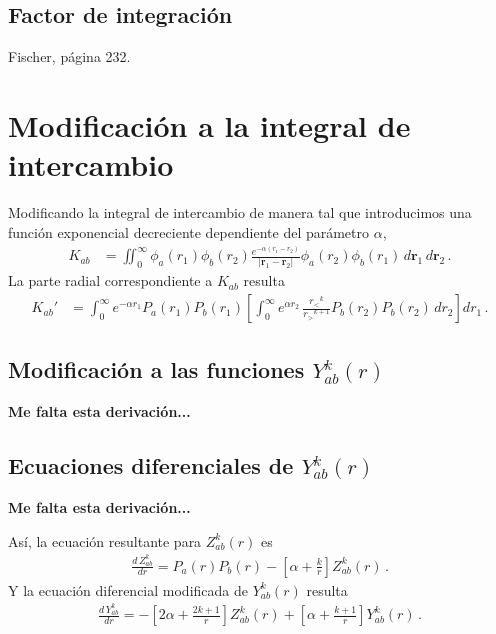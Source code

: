 \documentclass[11pt]{article}
\begin{document}
\subsection{Factor de integración}

Fischer, página 232.

\section{Modificación a la integral de intercambio}

Modificando la integral de intercambio de manera tal que introducimos una función exponencial decreciente dependiente del parámetro $\alpha$,
\begin{align}
K_{ab} &= \iint_0^{\infty}{ \phi_a(r_1)\phi_b(r_2)\frac{e^{-\alpha(r_1-r_2)}}{\left|\mathbf{r}_1-\mathbf{r}_2\right|}\phi_a(r_2)\phi_b(r_1)}\,d\mathbf{r}_1\,d\mathbf{r}_2\,.
\end{align}
La parte radial correspondiente a $K_{ab}$ resulta
\begin{align}
 K_{ab}' &= \int_0^{\infty} e^{-\alpha r_1} P_a(r_1)P_b(r_1) \left[ \int_0^{\infty} e^{\alpha r_2}\,\frac{{r_<}^k}{{r_>}^{k+1}} P_b(r_2)P_b(r_2)\,dr_2 \right] dr_1\,.
\end{align}

\subsection{Modificación a las funciones $Y_{ab}^k(r)$}

{\color{red}\bf Me falta esta derivación...}

\subsection{Ecuaciones diferenciales de $Y_{ab}^k(r)$}

{\color{red}\bf Me falta esta derivación...}

\vspace{0.25cm}
Así, la ecuación resultante para $Z_{ab}^k(r)$ es
\begin{align}
 \frac{d\,Z_{ab}^k}{dr}=P_a(r)P_b(r)-\left[\alpha+\frac{k}{r}\right] Z_{ab}^k(r)\,.
 \label{eq:dZabk_alpha}
\end{align}
Y la ecuación diferencial modificada de $Y_{ab}^k(r)$ resulta
\begin{align}
 \frac{d\,Y_{ab}^k}{dr}=-\left[2\alpha+\frac{2k+1}{r}\right]Z_{ab}^k(r) + \left[\alpha+\frac{k+1}{r}\right] Y_{ab}^k(r)\,.
 \label{eq:dYabk_alpha}
\end{align}
\end{document}
